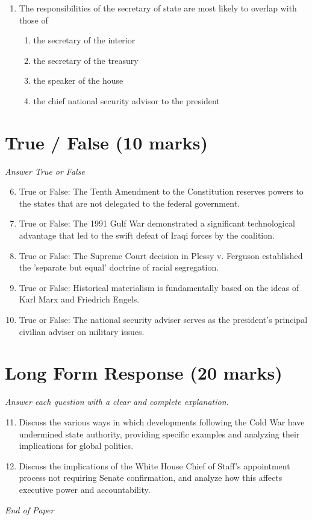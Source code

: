 \documentclass[12pt]{article}
\begin{document}
\begin{enumerate}[label=\arabic*.]
\begin{enumerate}[label=(\alph*)]
    \item Appoint Supreme Court justices
    \item Negotiate and ratify treaties
    \item Declare war
\end{enumerate}
\item The responsibilities of the secretary of state are most likely to overlap with those of
\begin{enumerate}[label=(\alph*)]
    \item the secretary of the interior
    \item the secretary of the treasury
    \item the speaker of the house
    \item the chief national security advisor to the president
\end{enumerate}
\end{enumerate}

\section*{True / False (10 marks)}
\textit{Answer True or False}
\begin{enumerate}[label=\arabic*.]
\setcounter{enumi}{5}
\item True or False: The Tenth Amendment to the Constitution reserves powers to the states that are not delegated to the federal government.
\item True or False: The 1991 Gulf War demonstrated a significant technological advantage that led to the swift defeat of Iraqi forces by the coalition.
\item True or False: The Supreme Court decision in Plessy v. Ferguson established the 'separate but equal' doctrine of racial segregation.
\item True or False: Historical materialism is fundamentally based on the ideas of Karl Marx and Friedrich Engels.
\item True or False: The national security adviser serves as the president's principal civilian adviser on military issues.
\end{enumerate}

\section*{Long Form Response (20 marks)}
\textit{Answer each question with a clear and complete explanation.}
\begin{enumerate}[label=\arabic*.]
\setcounter{enumi}{10}
\item Discuss the various ways in which developments following the Cold War have undermined state authority, providing specific examples and analyzing their implications for global politics.
\item Discuss the implications of the White House Chief of Staff's appointment process not requiring Senate confirmation, and analyze how this affects executive power and accountability.
\end{enumerate}

\vfill
\noindent\textit{End of Paper}
\end{document}
